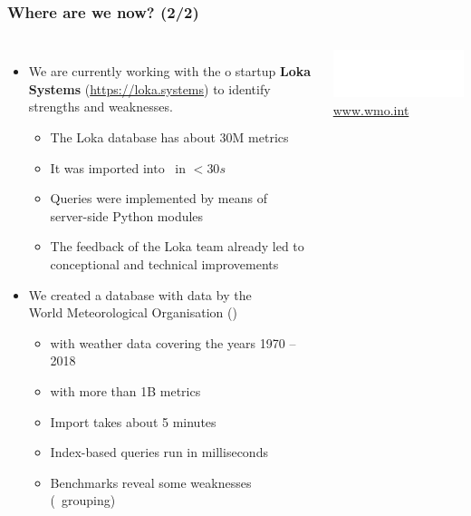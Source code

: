 \documentclass[mathserif,usenames,dvipsnames]{beamer}
\begin{document}
\begin{frame}[shrink]
\frametitle{Where are we now? (2/2)}
\begin{columns}[T]
\begin{itemize}
\item We are currently working with the o
      startup \textbf{Loka Systems} (\url{https://loka.systems})
      to identify strengths and weaknesses.
      \begin{itemize}
      \item The Loka database has about 30M metrics
      \item It was imported into \nowdb\ in $< 30s$
      \item Queries were implemented by means of\\
            server-side Python modules
      \item The feedback of the Loka team already led
            to conceptional and technical improvements
      \end{itemize}
\item We created a database with data by the\\
      World Meteorological Organisation
      ()
      \begin{itemize}
      \item with weather data covering the years 1970 -- 2018
      \item with more than 1B metrics
      \item Import takes about 5 minutes
      \item Index-based queries run in milliseconds
      \item Benchmarks reveal some weaknesses \\
            (\eg\ grouping)
      \end{itemize}
\end{itemize}
\begin{center}
\linewidth
\includegraphics[width=0.85\linewidth]{../img/lokalogo.png}
\vskip0.85cm
\linewidth
\vskip1.0cm
\linewidth
{\color{MidnightBlue} \url{www.wmo.int}}
\end{center}
\end{columns}
\end{frame}
\end{document}
